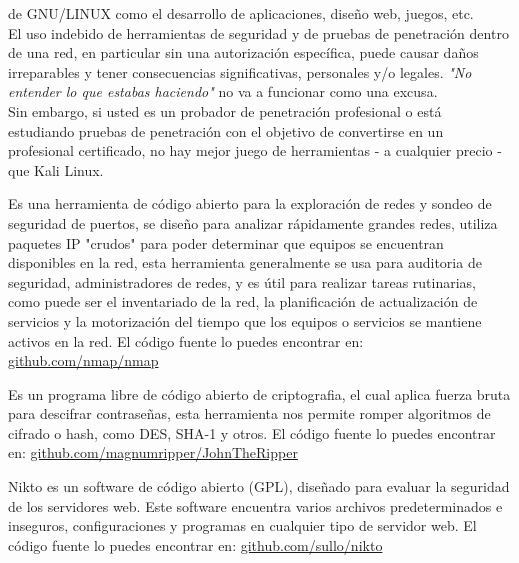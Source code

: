 \begin{multicols}{2}
de GNU/LINUX como el desarrollo de aplicaciones, diseño web, juegos, etc.\\

El uso indebido de herramientas de seguridad y de pruebas de penetración dentro de una red, en particular sin una autorización específica, puede causar daños irreparables y tener consecuencias significativas, personales y/o legales. \textit{"No entender lo que estabas haciendo"} no va a funcionar como una excusa.\\

Sin embargo, si usted es un probador de penetración profesional o está estudiando pruebas de penetración con el objetivo de convertirse en un profesional certificado, no hay mejor juego de herramientas - a cualquier precio - que Kali Linux.\\



Es una herramienta de código abierto para la exploración de redes y sondeo de seguridad de puertos, se diseño para analizar rápidamente grandes redes, utiliza paquetes IP "crudos" para poder determinar que equipos se encuentran disponibles en la red, esta herramienta generalmente se usa para auditoria de seguridad, administradores de redes, y es útil para realizar tareas rutinarias, como puede ser el inventariado de la red, la planificación de actualización de servicios y la motorización del tiempo que los equipos o servicios se mantiene activos en la red. El código fuente lo puedes encontrar en: \href{https://github.com/nmap/nmap}{github.com/nmap/nmap}\\


Es un programa libre de código abierto de criptografia, el cual aplica fuerza bruta para descifrar contraseñas, esta herramienta nos permite romper algoritmos de cifrado o hash, como DES, SHA-1 y otros. El código fuente lo puedes encontrar en: \href{https://github.com/magnumripper/JohnTheRipper}{github.com/magnumripper/JohnTheRipper}


Nikto es un software de código abierto (GPL), diseñado para evaluar la seguridad de los servidores web. Este software encuentra varios archivos predeterminados e inseguros, configuraciones y programas en cualquier tipo de servidor web. 
El código fuente lo puedes encontrar en: \href{https://github.com/sullo/nikto}{github.com/sullo/nikto}


\end{multicols}
